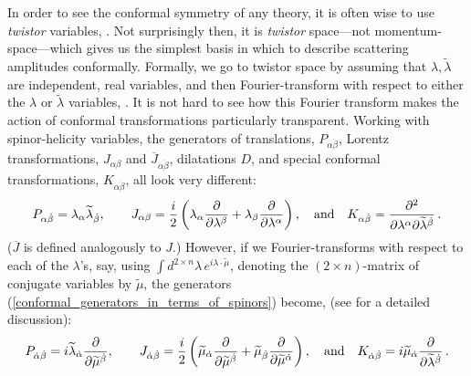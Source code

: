\documentclass[12pt,hyperref,compress]{JHEP3}
\renewcommand{\bar}{\overline}
\newcommand{\eq}[1]{\begin{equation}#1\end{equation}}
\begin{document}
{In order to see the conformal symmetry of any theory, it is often wise to use {\it twistor} variables, \cite{Penrose:1967wn,Penrose:1972ia,Penrose:1968me,Kronheimer:1967mq,Penrose:1999cw}. Not surprisingly then, it is {\it twistor} space---not momentum-space---which gives us the simplest basis in which to describe scattering amplitudes conformally. Formally, we go to twistor space by assuming that $\lambda, \widetilde \lambda$ are independent, real variables, and then Fourier-transform with respect to either the $\lambda$ or $\widetilde \lambda$ variables, \cite{Witten:2003nn}. It is not hard to see how this Fourier transform makes the action of conformal transformations particularly transparent. Working with spinor-helicity variables, the generators of translations, $P_{\alpha\dot{\beta}}$, Lorentz transformations, $J_{\alpha\beta}$ and $\bar{J}_{\dot{\alpha}\dot{\beta}}$, dilatations $D$, and special conformal transformations, $K_{\alpha \dot{\beta}}$, all look very different:
\vspace{-.3cm}\eq{P_{\alpha\dot\beta}=\lambda_\alpha\widetilde\lambda_{\dot\beta},\qquad J_{\alpha\beta}=\frac{i}{2}\left(\lambda_{\alpha}\frac{\partial}{\partial \lambda^\beta}+\lambda_{\beta}\frac{\partial}{\partial \lambda^\alpha}\right),\quad\mathrm{and}\quad K_{\alpha\dot{\beta}}=\frac{\partial^2}{\partial\lambda^{\alpha}\partial\widetilde\lambda^{\dot{\beta}}}\,.\vspace{-.3cm}\label{conformal_generators_in_terms_of_spinors}}
($\bar{J}$ is defined analogously to $J$.) However, if we Fourier-transforms with respect to each of the $\lambda$'s, say, using $\int\!\!d^{2\times n}\!\lambda\,e^{i\lambda\cdot\widetilde\mu}$, denoting the $(2\!\times\!n)$-matrix of conjugate variables by $\widetilde{\mu}$, the generators (\ref{conformal_generators_in_terms_of_spinors}) become, (see \cite{Witten:2003nn} for a detailed discussion):
\vspace{-.3cm}\eq{P_{\dot\alpha\dot\beta}=i\widetilde\lambda_{\dot\alpha}\frac{\partial}{\partial\widetilde\mu^{\dot{\beta}}},\qquad J_{\dot\alpha\dot\beta}=\frac{i}{2}\left(\widetilde\mu_{\dot\alpha}\frac{\partial}{\partial\widetilde\mu^{\dot\beta}}+\widetilde\mu_{\dot\beta}\frac{\partial}{\partial\widetilde\mu^{\dot\alpha}}\right),\quad\mathrm{and}\quad K_{\dot\alpha\dot\beta}=i\widetilde\mu_{\dot\alpha}\frac{\partial}{\partial\widetilde\lambda^{\dot\beta}}\,.\vspace{-.3cm}\label{conformal_generators_in_terms_of_ft_spinors}}

}
\end{document}
